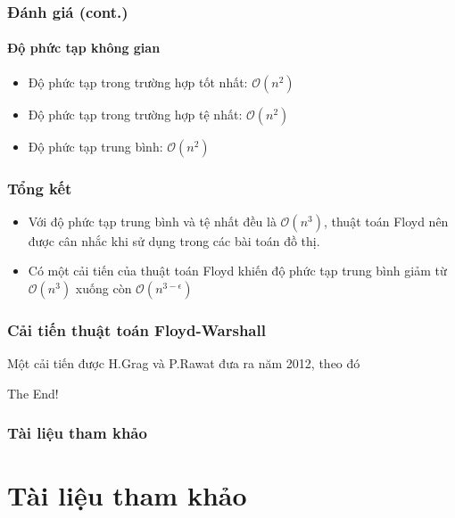 \documentclass[12pt]{beamer}
\begin{document}
    \begin{frame}[t]
        \frametitle{Đánh giá (cont.)}
        \framesubtitle{Độ phức tạp không gian}
        \begin{itemize}
            \item Độ phức tạp trong trường hợp tốt nhất: $\mathcal{O}(n^2)$
            \item Độ phức tạp trong trường hợp tệ nhất: $\mathcal{O}(n^2)$
            \item Độ phức tạp trung bình: $\mathcal{O}(n^2)$
        \end{itemize}
    \end{frame}

    \begin{frame}
        \frametitle{Tổng kết}
        \begin{itemize}
            \item Với độ phức tạp trung bình và tệ nhất đều là $\mathcal{O}(n^3)$, thuật toán Floyd nên được cân nhắc khi sử dụng trong các bài toán đồ thị.
            \item Có một cải tiến của thuật toán Floyd khiến độ phức tạp trung bình giảm từ $\mathcal{O}(n^3)$ xuống còn $\mathcal{O}(n^{3 - \epsilon})$
        \end{itemize}
    \end{frame}

    \begin{frame}
        \frametitle{Cải tiến thuật toán Floyd-Warshall}
        Một cải tiến được H.Grag và P.Rawat đưa ra năm 2012\cite{improve:article}, theo đó
    \end{frame}

    \begin{frame}
        \Large \centering
        The End!
    \end{frame}

    \begin{frame}[t]
        \frametitle{Tài liệu tham khảo}
        \section{Tài liệu tham khảo}
        
        
    \end{frame}
\end{document}
